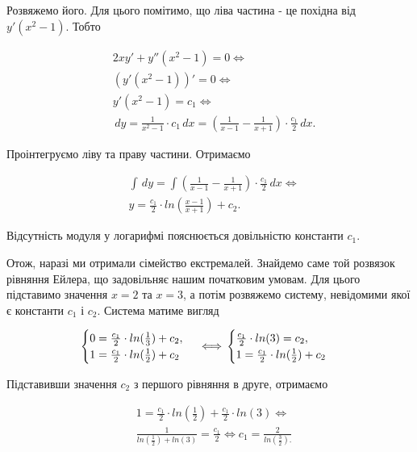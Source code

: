 \documentclass[12pt]{article}
\begin{document}
Розв\textquotesingle яжемо його. Для цього помітимо, що ліва частина - це похідна від $y'(x^2 - 1)$. Тобто

\begin{align*}
  & 2xy' + y''(x^2 - 1) = 0 \iff \\
  & (y'(x^2 - 1))' = 0 \iff \\
  & y'(x^2 - 1) = c_1 \iff \\
  & \, dy = \frac{1}{x^2 - 1}\cdot c_1 \, dx = (\frac{1}{x - 1} - \frac{1}{x + 1})\cdot \frac{c_1}{2} \, dx.
\end{align*}

Проінтегруємо ліву та праву частини. Отримаємо

\begin{align*}
  & \int \, dy = \int (\frac{1}{x - 1} - \frac{1}{x + 1})\cdot \frac{c_1}{2} \, dx \iff \\
  & y = \frac{c_1}{2}\cdot ln(\frac{x - 1}{x + 1}) + c_2.
\end{align*}

Відсутність модуля у логарифмі пояснюється довільністю константи $c_1$.

Отож, наразі ми отримали сімейство екстремалей. Знайдемо саме той розв\textquotesingle язок рівняння Ейлера, що задовільняє нашим початковим умовам. Для цього підставимо значення $x = 2$ та $x = 3$, а потім розв\textquotesingle яжемо систему, невідомими якої є константи $c_1$ і $c_2$. Система матиме вигляд

\begin{equation*}
  \begin{cases}
    0 = \frac{c_1}{2}\cdot ln(\frac{1}{3}) + c_2, \\
    1 = \frac{c_1}{2}\cdot ln(\frac{1}{2}) + c_2
  \end{cases} \iff \\
  \begin{cases}
    \frac{c_1}{2}\cdot ln(3) = c_2, \\
    1 = \frac{c_1}{2}\cdot ln(\frac{1}{2}) + c_2
  \end{cases}
\end{equation*}

Підставивши значення $c_2$ з першого рівняння в друге, отримаємо

\begin{align*}
  & 1 = \frac{c_1}{2}\cdot ln(\frac{1}{2}) + \frac{c_1}{2}\cdot ln(3) \iff \\
  & \frac{1}{ln(\frac{1}{2}) + ln(3)} = \frac{c_1}{2} \iff c_1 = \frac{2}{ln(\frac{3}{2}).}
\end{align*}
\end{document}
